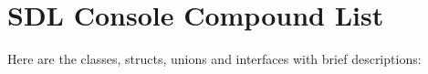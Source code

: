 \section{SDL Console Compound List}
Here are the classes, structs, unions and interfaces with brief descriptions:\begin{CompactList}
\item{}
\item{}
\end{CompactList}
